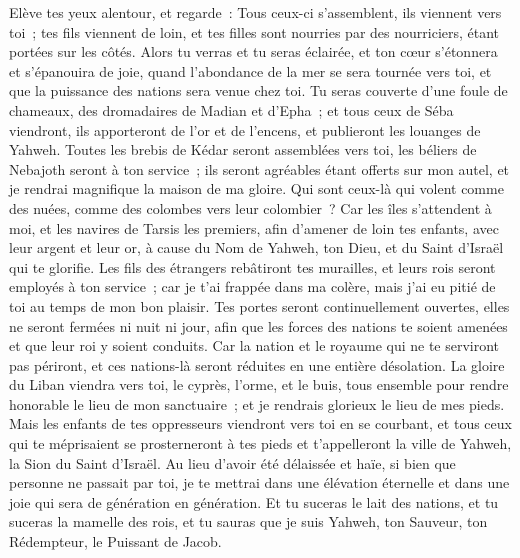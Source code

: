 \begin{multicols}{2}
Elève tes yeux alentour, et regarde~: Tous ceux-ci s'assemblent, ils viennent vers toi~; tes fils viennent de loin, et tes filles sont nourries par des nourriciers, étant portées sur les côtés.
Alors tu verras et tu seras éclairée, et ton cœur s'étonnera et s'épanouira de joie, quand l'abondance de la mer se sera tournée vers toi, et que la puissance des nations sera venue chez toi.
Tu seras couverte d'une foule de chameaux, des dromadaires de Madian et d'Epha~; et tous ceux de Séba viendront, ils apporteront de l'or et de l'encens, et publieront les louanges de Yahweh.
Toutes les brebis de Kédar seront assemblées vers toi, les béliers de Nebajoth seront à ton service~; ils seront agréables étant offerts sur mon autel, et je rendrai magnifique la maison de ma gloire.
Qui sont ceux-là qui volent comme des nuées, comme des colombes vers leur colombier~?
Car les îles s'attendent à moi, et les navires de Tarsis les premiers, afin d'amener de loin tes enfants, avec leur argent et leur or, à cause du Nom de Yahweh, ton Dieu, et du Saint d'Israël qui te glorifie.
Les fils des étrangers rebâtiront tes murailles, et leurs rois seront employés à ton service~; car je t'ai frappée dans ma colère, mais j'ai eu pitié de toi au temps de mon bon plaisir.
Tes portes seront continuellement ouvertes, elles ne seront fermées ni nuit ni jour, afin que les forces des nations te soient amenées et que leur roi y soient conduits.
Car la nation et le royaume qui ne te serviront pas périront, et ces nations-là seront réduites en une entière désolation.
La gloire du Liban viendra vers toi, le cyprès, l'orme, et le buis, tous ensemble pour rendre honorable le lieu de mon sanctuaire~; et je rendrais glorieux le lieu de mes pieds.
Mais les enfants de tes oppresseurs viendront vers toi en se courbant, et tous ceux qui te méprisaient se prosterneront à tes pieds et t'appelleront la ville de Yahweh, la Sion du Saint d'Israël.
Au lieu d'avoir été délaissée et haïe, si bien que personne ne passait par toi, je te mettrai dans une élévation éternelle et dans une joie qui sera de génération en génération.
Et tu suceras le lait des nations, et tu suceras la mamelle des rois, et tu sauras que je suis Yahweh, ton Sauveur, ton Rédempteur, le Puissant de Jacob.

\end{multicols}
